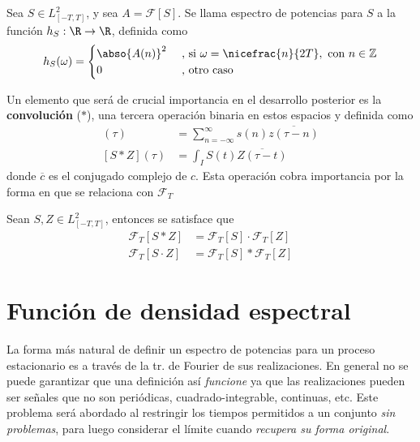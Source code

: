 \begin{definicion}
Sea $S \in L^{2}_{[-T,T]}$, y sea $A = \mathcal{F}[S]$. Se llama espectro de potencias 
para $S$ a la función $h_S : \R \rightarrow \R $, definida como
\begin{equation*}
h_S(\omega) = 
\begin{cases}
\abso{A(n)}^{2} & \text{ , si } \omega = \nicefrac{n}{2T}, \text{   con } n\in \mathbb{Z} \\
0 & \text{ ,  otro caso}
\end{cases}
\end{equation*}
\label{espec}
\end{definicion}

Un elemento que será de crucial importancia en el desarrollo posterior es la \textbf{convolución} 
($\ast$), una tercera operación binaria en estos espacios y definida como
%
\begin{align*}
[s \ast z] (\tau) &= \sum_{n=-\infty}^{\infty} s(n) \overline{z(\tau-n)} \\
[S \ast Z] (\tau) &= \int_I S(t) \overline{Z(\tau-t)}
\end{align*}
%
donde $\overline{c}$ es el conjugado complejo de $c$. 
%
Esta operación cobra importancia por la forma en que se relaciona con $\mathcal{F}_T$
%
\begin{observacion}%
Sean $S,Z \in L^{2}_{[-T,T]}$, entonces se satisface que
\begin{align*}
\mathcal{F}_T[S\ast Z]  &= \mathcal{F}_T[S] \cdot \mathcal{F}_T[Z] \\
\mathcal{F}_T[S\cdot Z] &= \mathcal{F}_T[S] \ast  \mathcal{F}_T[Z] 
\end{align*}
\label{t_convolucion}
\end{observacion}


\section{Función de densidad espectral}

La forma más natural de definir un espectro de potencias para un proceso estacionario es a través 
de la tr. de Fourier de sus realizaciones. En general no se puede garantizar que una definición así \textit{funcione} ya que las realizaciones pueden ser señales que no son periódicas, 
cuadrado-integrable, continuas, etc.
%
Este problema será abordado al restringir los tiempos permitidos a un conjunto \textit{sin 
problemas}, para luego considerar el límite cuando \textit{recupera su forma original}.

